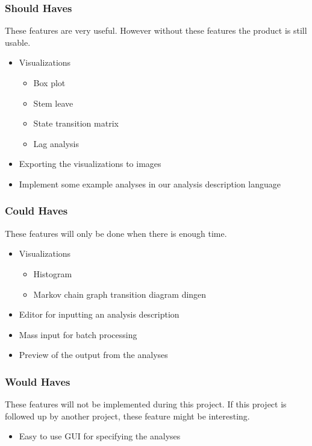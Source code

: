 \subsubsection{Should Haves}
These features are very useful. However without these features the product is still usable.
\begin{itemize}
	\item Visualizations
    \begin{itemize}
    	\item Box plot
        \item Stem leave
        \item State transition matrix
        \item Lag analysis
    \end{itemize}
	\item Exporting the visualizations to images
    \item Implement some example analyses in our analysis description language
\end{itemize}

\subsubsection{Could Haves}
These features will only be done when there is enough time.
 \begin{itemize}
  \item Visualizations
  \begin{itemize}
	  \item Histogram
      \item Markov chain graph transition diagram dingen
  \end{itemize}
  \item Editor for inputting an analysis description 
  \item Mass input for batch processing 
  \item Preview of the output from the analyses
\end{itemize}

\subsubsection{Would Haves}
These features will not be implemented during this project. If this project is followed up by another project, these feature might be interesting.
\begin{itemize}
	\item Easy to use GUI for specifying the analyses 
\end{itemize}
